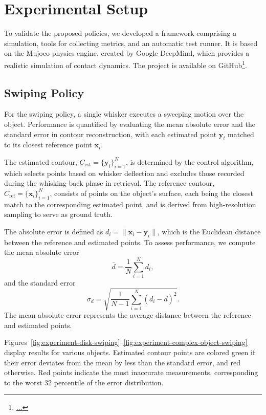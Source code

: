 

\chapter{Experimental Setup}

To validate the proposed policies, we developed a framework comprising a simulation, tools for collecting metrics, and an automatic test runner.
It is based on the Mujoco physics engine, created by Google DeepMind, which provides a realistic simulation of contact dynamics.
The project is available on GitHub\footnote{\url{...}}.


\section{Swiping Policy} \label{sec:swiping-policy}

For the swiping policy, a single whisker executes a sweeping motion over the object.
Performance is quantified by evaluating the mean absolute error and the standard error in contour reconstruction, with each estimated point $\mathbf{y}_i$ matched to its closest reference point $\mathbf{x}_i$.

The estimated contour, $C_{\text{est}} = \{\mathbf{y}_i\}_{i=1}^N$, is determined by the control algorithm, which selects points based on whisker deflection and excludes those recorded during the whisking-back phase in retrieval.
The reference contour, $C_{\text{ref}} = \{\mathbf{x}_i\}_{i=1}^N$, consists of points on the object's surface, each being the closest match to the corresponding estimated point, and is derived from high-resolution sampling to serve as ground truth.

The absolute error is defined as $d_i = \|\mathbf{x}_i - \mathbf{y}_i\|$, which is the Euclidean distance between the reference and estimated points.
To assess performance, we compute the mean absolute error
\[
    \bar{d} = \frac{1}{N}\sum_{i=1}^{N} d_i,
\]
and the standard error
\[
    \sigma_d = \sqrt{\frac{1}{N-1}\sum_{i=1}^{N} (d_i - \bar{d})^2}.
\]
The mean absolute error represents the average distance between the reference and estimated points.

Figures~\ref{fig:experiment-disk-swiping}--\ref{fig:experiment-complex-object-swiping} display results for various objects.
Estimated contour points are colored green if their error deviates from the mean by less than the standard error, and red otherwise.
Red points indicate the most inaccurate measurements, corresponding to the worst 32 percentile of the error distribution.

